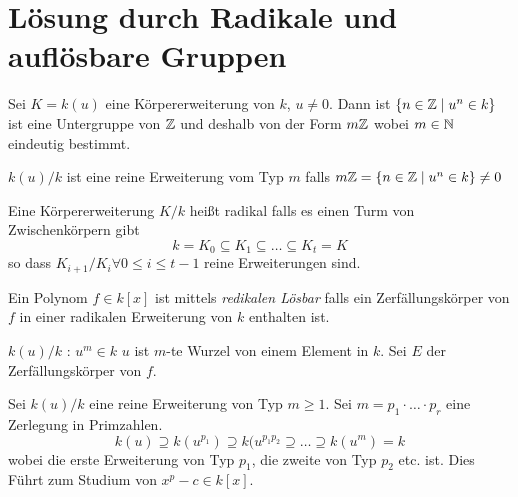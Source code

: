 \graphicspath{{Images/}}

\chapter{Lösung durch Radikale und auflösbare Gruppen}

Sei $K = k(u)$ eine Körpererweiterung von $k$, $u \neq 0$.
Dann ist $\{n \in \mathbb{Z} \mid u^{n} \in k\}$ ist eine Untergruppe von $\mathbb{Z}$ und deshalb von der Form $m \mathbb{Z}$ wobei $m \in \mathbb{N}$
eindeutig bestimmt.

\begin{definition}
	$k(u) / k$ ist eine reine Erweiterung vom Typ $m$ falls $m \mathbb{Z} = \{n \in \mathbb{Z} \mid u^{n} \in k\} \neq 0$
\end{definition}

\begin{definition}
	Eine Körpererweiterung $K / k$ heißt radikal falls es einen Turm von Zwischenkörpern gibt
	\[
	k = K_0 \subseteq K_1 \subseteq \ldots \subseteq K_{t} = K
	\] 
	so dass $K_{i+1} / K_{i} \forall 0 \leq i \leq t-1$ reine Erweiterungen sind.
\end{definition}

\begin{definition}
	Ein Polynom $f \in k[x]$ ist mittels \emph{redikalen Lösbar} falls ein Zerfällungskörper von $f$ in einer radikalen Erweiterung
	von $k$ enthalten ist.
\end{definition}

$k(u) / k$ : $u^{m} \in k$ $u$ ist $m$-te Wurzel von einem Element in $k$.
Sei $E$ der Zerfällungskörper von $f$.


Sei $k(u) / k$ eine reine Erweiterung von Typ $m \geq 1$.
Sei $m = p_1 \cdot \ldots \cdot p_{r}$ eine Zerlegung in Primzahlen.
\[
	k(u) \supseteq k(u^{p_1}) \supseteq k(u^{p_1 p_2} \supseteq \ldots \supseteq k(u^{m}) = k
\] 
wobei die erste Erweiterung von Typ $p_1$, die zweite von Typ $p_2$ etc. ist.
Dies Führt zum Studium von $x^{p} - c \in k[x]$.

